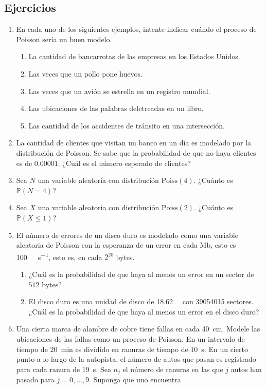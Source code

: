 \subsection{Ejercicios}

\begin{enumerate}
	\item En cada uno de los siguientes ejemplos, intente indicar cuándo el proceso de Poisson sería un buen modelo.
	\begin{enumerate}
		\item La cantidad de bancarrotas de las empresas en los Estados Unidos.
		\item Las  veces que un pollo pone huevos.
		\item Las veces que un avión se estrella en un registro mundial.
		\item Las ubicaciones de las palabras deletreadas en un libro.
		\item Las cantidad de los accidentes de tránsito en una intersección.
	\end{enumerate}
	\item La cantidad de clientes que visitan un banco en un día es modelado por la distribución de Poisson. Se sabe que la probabilidad de que no haya clientes es de $0.00001$. ¿Cuál es el número esperado de clientes?
	\item Sea $N$ una variable aleatoria con distribución $\mathrm{Poiss}(4)$. ¿Cuánto es $\mathds{P}\left(N=4\right)$?
	\item Sea $X$ una variable aleatoria con distribución $\mathrm{Poiss}(2)$. ¿Cuánto es $\mathds{P}\left(X\le1\right)$?
	\item El número de errores de un disco duro es modelado como una variable aleatoria de Poisson con la esperanza de un error en cada Mb, esto es \SI{100}{\mega\byte\per\second}, esto es, en cada $2^{20}$ bytes.
	\begin{enumerate}
		\item ¿Cuál es la probabilidad de que haya al menos un error en un sector de $512$ bytes?
		\item El disco duro es una unidad de disco de \SI{18.62}{\giga\byte} con \num{39054015} sectores. ¿Cuál es la probabilidad de que haya al menos un error en el disco duro?
	\end{enumerate}
	\item Una cierta marca de alambre de cobre tiene fallas en cada \SI{40}{\centi\metre}. Modele las  ubicaciones de las fallas como un proceso de Poisson. En un intervalo de tiempo de \SI{20}{\minute} es dividido en ranuras de tiempo de \SI{10}{\second}. En un cierto punto a lo largo de la autopista, el número de autos que pasan es registrado para cada ranura de \SI{19}{\second}. Sea $n_j$ el número de ranuras en las que $j$ autos han pasado para $j=0,\ldots,9$. Suponga que uno encuentra

\end{enumerate}

